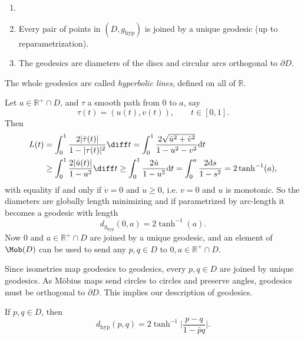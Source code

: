 \documentclass[12pt]{article}
\begin{document}
\begin{lemma}
	\begin{enumerate}[\normalfont(i)]
		\item[]
		\item Every pair of points in $(D, g_{\mathrm{hyp}})$ is joined by a unique geodesic (up to reparametrization).
		\item The geodesics are diameters of the discs and circular arcs orthogonal to $\partial D$.%
	\end{enumerate}
\end{lemma}

The whole geodesics are called \emph{hyperbolic lines}, defined on all of $\mathbb{R}$.


\begin{proofbox}
	Let $a \in \mathbb{R}^{+} \cap D$, and $\tau$ a smooth path from $0$ to $a$, say
	\[
		\tau(t) = (u(t), v(t)), \qquad t \in [0, 1].
	\]
	Then
	\begin{align*}
		L(t) &= \int_0^1 \frac{2|\dot \tau(t)|}{1 - |\tau(t)|^2}\diff t = \int_0^1 \frac{2 \sqrt{\dot u^2 + \dot v^2}}{1 - u^2 - v^2} \mathrm dt \\
		     &\ge \int_0^1 \frac{2|\dot u(t)|}{1 - u^2}\diff t \ge \int_0^1 \frac{2 \dot u}{1 - u^2} \mathrm dt = \int_0^a \frac{2 \mathrm ds}{1-s^2} = 2 \tanh^{-1}(a),
	\end{align*}
	with equality if and only if $\dot v = 0$ and $\dot u \ge 0$, i.e. $v = 0$ and $u$ is monotonic. So the diameters are globally length minimizing and if parametrized by arc-length it becomes a geodesic with length
	\[
		d_{g_{\mathrm{hyp}}}(0, a) = 2 \tanh^{-1}(a).
	\]
	Now $0$ and $a \in \mathbb{R}^{+} \cap D$ are joined by a unique geodesic, and an element of $\Mob(D)$ can be used to send any $p, q \in D$ to $0, a \in \mathbb{R}^{+} \cap D$.

	Since isometries map geodesics to geodesics, every $p, q \in D$ are joined by unique geodesics. As M\"{o}bius maps send circles to circles and preserve angles, geodesics must be orthogonal to $\partial D$. This implies our description of geodesics.
\end{proofbox}

\begin{corollary}
	If $p, q \in D$, then
	\[
		d_{\mathrm{hyp}}(p, q) = 2 \tanh^{-1} \biggl| \frac{p-q}{1 - \bar p q} \biggr|.
	\]
\end{corollary}
\end{document}
